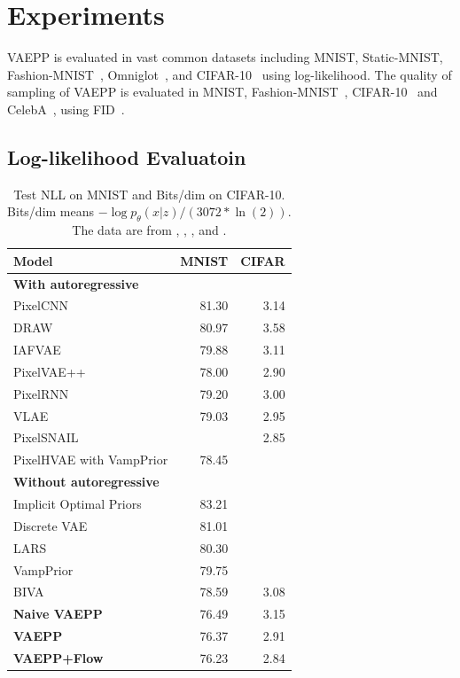\section{Experiments}
VAEPP is evaluated in vast common datasets including MNIST, Static-MNIST\cite{larochelle2011neural}, Fashion-MNIST~\cite{xiao2017/online}, Omniglot~\cite{lake2015human}, and CIFAR-10~\cite{krizhevsky2009learning} using log-likelihood. The quality of sampling of VAEPP is evaluated in MNIST, Fashion-MNIST~\cite{xiao2017/online}, CIFAR-10~\cite{krizhevsky2009learning} and CelebA~\cite{liu2015deep}, using FID~\cite{heusel2017gans}.
\subsection{Log-likelihood Evaluatoin}
\begin{table}[tb]
\centering
\begin{tabular}{lrr}  
\toprule
Model  &  MNIST & CIFAR\\
\midrule
\textbf{With autoregressive}   \\
PixelCNN         &  81.30  &  3.14   \\
DRAW             &  80.97  &  3.58    \\
IAFVAE           &  79.88  &  3.11    \\
PixelVAE++       &  78.00  &  2.90   \\
PixelRNN         &  79.20  &  3.00    \\
VLAE             &  79.03  &  2.95     \\
PixelSNAIL       &         & 2.85      \\
PixelHVAE with VampPrior &  78.45  &     \\
\midrule
\textbf{Without autoregressive}   \\
Implicit Optimal Priors & 83.21 \\
Discrete VAE     &  81.01     \\
LARS             &  80.30     \\
VampPrior        &  79.75     \\
BIVA            &  78.59      &    3.08    \\
\textbf{Naive VAEPP}      &  76.49 & 3.15    \\
\textbf{VAEPP}            &  76.37 & 2.91	    \\
\textbf{VAEPP+Flow}       &  76.23 & 2.84    \\
\bottomrule
\end{tabular}
\caption{Test NLL on MNIST and Bits/dim on CIFAR-10. Bits/dim means $-\log p_\theta(x|z) / (3072 * \ln(2))$. The data are from \protect\cite{maaloe2019biva},  \protect\cite{chen2018pixelsnail}, \protect\cite{tomczak2018vae}, \protect\cite{bauer2019resampled} and \protect\cite{takahashi2019variational}. 
}
\end{table}
